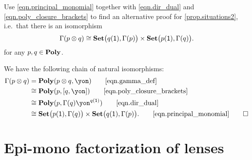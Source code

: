 \documentclass[Book-Poly]{subfiles}
\begin{document}
\begin{exercise}
Use \eqref{eqn.principal_monomial} together with \eqref{eqn.dir_dual} and \eqref{eqn.poly_closure_brackets} to find an alternative proof for \cref{prop.situations2}, i.e.\ that there is an isomorphism
\[
    \Gamma(p\otimes q) \cong \mathbf{Set}\big(q(\textsf{1}),\Gamma(p)\big) \times \mathbf{Set}\big(p(\textsf{1}),\Gamma(q)\big).
\]
for any $p,q\in\mathbf{Poly}$.
\begin{solution}
We have the following chain of natural isomorphisms:
\begin{align*}
	\Gamma(p \otimes q) &=
	\poly(p \otimes q,\yon)
	\tag*{\eqref{eqn.gamma_def}} \\
	&\iso
	\poly(p, \ihom{q,\yon})
	\tag*{\eqref{eqn.poly_closure_brackets}} \\
	&\iso
	\poly(p, \Gamma(q)\yon^{q(\1)})
	\tag*{\eqref{eqn.dir_dual}} \\
	&\iso
	\smset\big(p(\1),\Gamma(q)\big) \times \smset\big(q(\1),\Gamma(p)\big).
	\tag*{\eqref{eqn.principal_monomial}}
\qedhere
\end{align*}
\end{solution}
\end{exercise}

\section{Epi-mono factorization of lenses}
\end{document}

